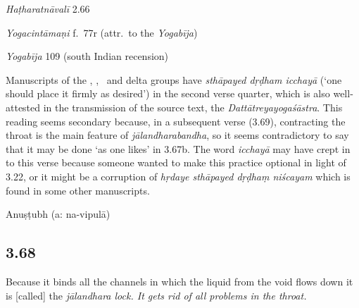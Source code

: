 \begin{ekdosis}
\begin{testimonia}[hp03_067]
\emph{Haṭharatnāvalī} 2.66
\begin{versinnote}
\end{versinnote}

\emph{Yogacintāmaṇi} f.~77r (attr.~to the \emph{Yogabīja})
\begin{versinnote}
\end{versinnote}

\emph{Yogabīja} 109 (south Indian recension)
\begin{versinnote}
\tl{\var{amṛtāvyaya°] amṛtavyaya° \vl}\\!}
\end{versinnote}

\end{testimonia}

\begin{philcomm}[hp03_067]
Manuscripts of the \textalpha, \textbeta, \texteta\ and delta groups have \emph{sthāpayed dṛḍham icchayā} (`one should place it firmly as desired') in the second verse quarter, which is also well-attested in the transmission of the source text, the \emph{Dattātreyayogaśāstra}. This reading seems secondary because, in a subsequent verse (3.69), contracting the throat is the main feature of \emph{jālandharabandha}, so it seems contradictory to say that it may be done `as one likes' in 3.67b. The word \emph{icchayā} may have crept in to this verse because someone wanted to make this practice optional in light of 3.22, or it might be a corruption of \emph{hṛdaye sthāpayed dṛḍhaṃ niścayam} which is found in some other manuscripts.
\end{philcomm}

\begin{metre}[hp03_067]
Anuṣṭubh (a: na-vipulā)
\end{metre}

\subsection*{3.68}
\begin{translation}[hp03_068]
Because it binds all the channels in which the liquid from the void flows down it is [called] the \sl{jālandhara} lock. It gets rid of all problems in the throat.%
\end{translation}


\end{ekdosis}
